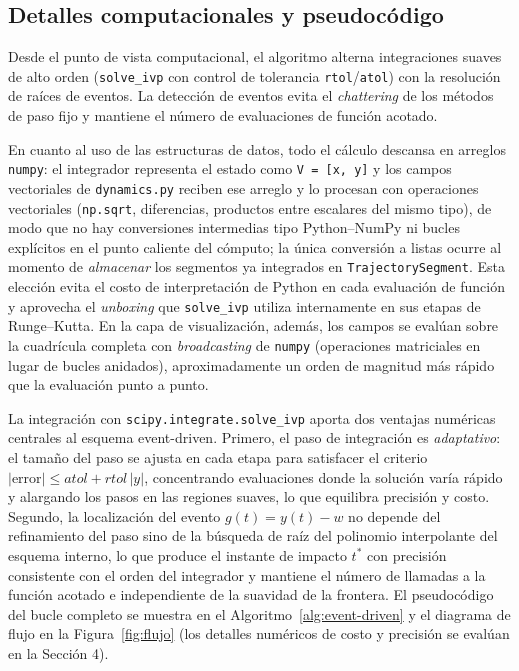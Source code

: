 \documentclass[12pt,letterpaper]{article}
\begin{document}
\subsection{Detalles computacionales y pseudocódigo}
Desde el punto de vista computacional, el algoritmo alterna integraciones suaves de alto orden (\texttt{solve\_ivp} con control de tolerancia \texttt{rtol}/\texttt{atol}) con la resolución de raíces de eventos. La detección de eventos evita el \emph{chattering} de los métodos de paso fijo y mantiene el número de evaluaciones de función acotado.

En cuanto al uso de las estructuras de datos, todo el cálculo descansa en arreglos \texttt{numpy}: el integrador representa el estado como \texttt{V = [x, y]} y los campos vectoriales de \texttt{dynamics.py} reciben ese arreglo y lo procesan con operaciones vectoriales (\texttt{np.sqrt}, diferencias, productos entre escalares del mismo tipo), de modo que no hay conversiones intermedias tipo Python--NumPy ni bucles explícitos en el punto caliente del cómputo; la única conversión a listas ocurre al momento de \emph{almacenar} los segmentos ya integrados en \texttt{TrajectorySegment}. Esta elección evita el costo de interpretación de Python en cada evaluación de función y aprovecha el \emph{unboxing} que \texttt{solve\_ivp} utiliza internamente en sus etapas de Runge--Kutta. En la capa de visualización, además, los campos se evalúan sobre la cuadrícula completa con \emph{broadcasting} de \texttt{numpy} (operaciones matriciales en lugar de bucles anidados), aproximadamente un orden de magnitud más rápido que la evaluación punto a punto.

La integración con \texttt{scipy.integrate.solve\_ivp} aporta dos ventajas numéricas centrales al esquema event-driven. Primero, el paso de integración es \emph{adaptativo}: el tamaño del paso se ajusta en cada etapa para satisfacer el criterio $\lvert \text{error} \rvert \leq \mathit{atol} + \mathit{rtol}\,\lvert y \rvert$, concentrando evaluaciones donde la solución varía rápido y alargando los pasos en las regiones suaves, lo que equilibra precisión y costo. Segundo, la localización del evento $g(t) = y(t)-w$ no depende del refinamiento del paso sino de la búsqueda de raíz del polinomio interpolante del esquema interno, lo que produce el instante de impacto $t^*$ con precisión consistente con el orden del integrador y mantiene el número de llamadas a la función acotado e independiente de la suavidad de la frontera. El pseudocódigo del bucle completo se muestra en el Algoritmo~\ref{alg:event-driven} y el diagrama de flujo en la Figura~\ref{fig:flujo} (los detalles numéricos de costo y precisión se evalúan en la Sección 4).
\end{document}
